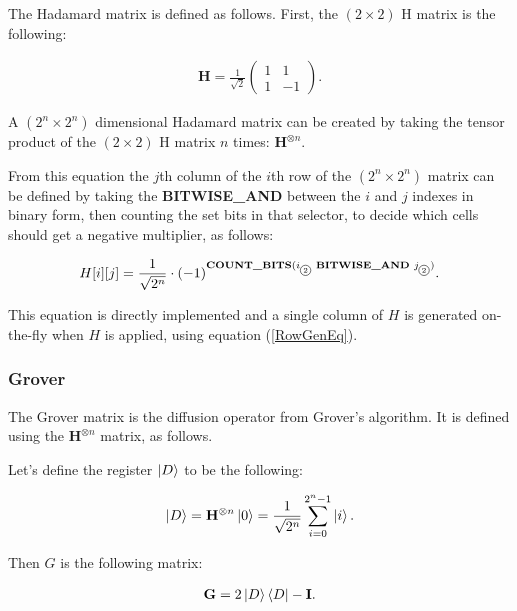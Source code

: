 The Hadamard matrix is defined as follows. First, the $(2\times{}2)$ H matrix is the following:

\begin{align*}
  \mathbf{H} = \frac{1}{\sqrt{2}}\begin{pmatrix}
      1 & 1  \\
      1 & -1
    \end{pmatrix}.
\end{align*}

A $(2^n\times{}2^n)$ dimensional Hadamard matrix can be created by taking the tensor product of the $(2\times{}2)$ H matrix $n$ times: $\mathbf{H}^{\otimes{}n}$.

From this equation the $j$th column of the $i$th row of the $(2^n\times{}2^n)$ matrix can be defined by taking the \textbf{BITWISE\_AND} between the $i$ and $j$ indexes in binary form, then counting the set bits in that selector, to decide which cells should get a negative multiplier, as follows:

\newcommand*\circled[1]{\tikz[baseline=(char.base)]{
            \node[shape=circle,draw,inner sep=1pt] (char) {#1};}}

\begin{align*}
H[i][j] = \frac{1}{\sqrt{2^n}}\cdot{}(-1)^{\text{\textbf{COUNT\_BITS}}(i_{\text{\circled{2}}} \text{\textbf{ BITWISE\_AND }} j_{\text{\circled{2}}})}.
\end{align*}

This equation is directly implemented and a single column of $H$ is generated on-the-fly when $H$ is applied, using equation (\ref{RowGenEq}).

\subsubsection{Grover}

The Grover matrix is the diffusion operator from Grover's algorithm. It is defined using the $\mathbf{H}^{\otimes{}n}$ matrix, as follows.

Let's define the register $\ket{D}$ to be the following:

\begin{align*}
\ket{D} = \mathbf{H}^{\otimes{}n}\ket{0} =
\frac{1}{\sqrt{2^n}} \sum\limits_{i=0}^{2^n-1} \ket{i}.
\end{align*}

Then $G$ is the following matrix:

\begin{align*}
    \mathbf{G} = 2\ket{D}\bra{D} - \mathbf{I}.
\end{align*}


